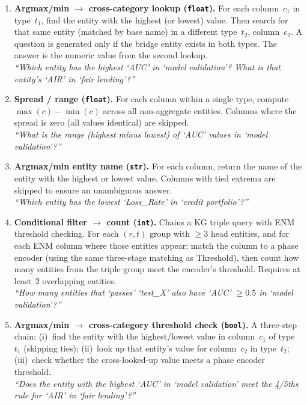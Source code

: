 \documentclass[11pt]{article}
\begin{document}
\begin{enumerate}[leftmargin=2em, label=(\alph*)]
  \item \textbf{Argmax/min $\to$ cross-category lookup (\texttt{float}).}
    For each column~$c_1$ in type~$t_1$, find the entity with the
    highest (or lowest) value.  Then search for that same entity
    (matched by base name) in a different type~$t_2$, column~$c_2$.
    A question is generated only if the bridge entity exists in both
    types.  The answer is the numeric value from the second lookup.\\
    \emph{``Which entity has the highest `AUC' in `model validation'?
    What is that entity's `AIR' in `fair lending'?''}

  \item \textbf{Spread / range (\texttt{float}).}
    For each column within a single type, compute
    $\max(c) - \min(c)$ across all non-aggregate entities.  Columns
    where the spread is zero (all values identical) are skipped.\\
    \emph{``What is the range (highest minus lowest) of `AUC' values
    in `model validation'?''}

  \item \textbf{Argmax/min entity name (\texttt{str}).}
    For each column, return the name of the entity with the highest
    or lowest value.  Columns with tied extrema are skipped to ensure
    an unambiguous answer.\\
    \emph{``Which entity has the lowest `Loss\_Rate' in
    `credit portfolio'?''}

  \item \textbf{Conditional filter $\to$ count (\texttt{int}).}
    Chains a KG triple query with ENM threshold checking.  For each
    $(r, t)$ group with $\geq 3$ head entities, and for each ENM column
    where those entities appear: match the column to a phase encoder
    (using the same three-stage matching as Threshold), then count how
    many entities from the triple group meet the encoder's threshold.
    Requires at least~2 overlapping entities.\\
    \emph{``How many entities that `passes' `test\_X' also have
    `AUC' $\geq 0.5$ in `model validation'?''}

  \item \textbf{Argmax/min $\to$ cross-category threshold check
    (\texttt{bool}).}
    A three-step chain: (i)~find the entity with the highest/lowest
    value in column~$c_1$ of type~$t_1$ (skipping ties);
    (ii)~look up that entity's value for column~$c_2$ in type~$t_2$;
    (iii)~check whether the cross-looked-up value meets a phase encoder
    threshold.\\
    \emph{``Does the entity with the highest `AUC' in `model validation'
    meet the 4/5ths rule for `AIR' in `fair lending'?''}
\end{enumerate}
\end{document}
